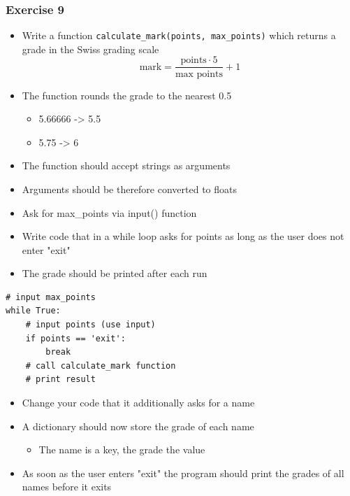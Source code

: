 \documentclass[10pt, a4paper]{beamer} %
\begin{document}
{\begin{frame}[c, fragile]
\end{frame}

\begin{frame}\frametitle{Exercise 9}
    
\begin{itemize}
    \item Write a function \texttt{calculate\_mark(points, max\_points)} which returns a grade in the Swiss grading scale
    \[ \text{mark} = \frac{\text{points}\cdot 5}{\text{max points}} + 1 \]
    \item The function rounds the grade to the nearest 0.5
    \begin{itemize}
        \item 5.66666 -> 5.5
        \item 5.75 -> 6
    \end{itemize}
    \item The function should accept strings as arguments
    \item Arguments should be therefore converted to floats
\end{itemize}

\framebreak

\begin{itemize}
    \item Ask for max\_points via input() function
    \item Write code that in a while loop asks for points as long as the user does not enter "exit"
    \item The grade should be printed after each run
\end{itemize}

{
\mdseries
{}
\begin{lstlisting}
# input max_points
while True:
    # input points (use input)
    if points == 'exit':
        break
    # call calculate_mark function
    # print result
\end{lstlisting}
}
\framebreak

\begin{itemize}
    \item Change your code that it additionally asks for a name
    \item A dictionary should now store the grade of each name
    \begin{itemize}
        \item The name is a key, the grade the value
    \end{itemize}
    \item As soon as the user enters "exit" the program should print the grades of all names before it exits
\end{itemize}


\end{frame}}
\end{document}
